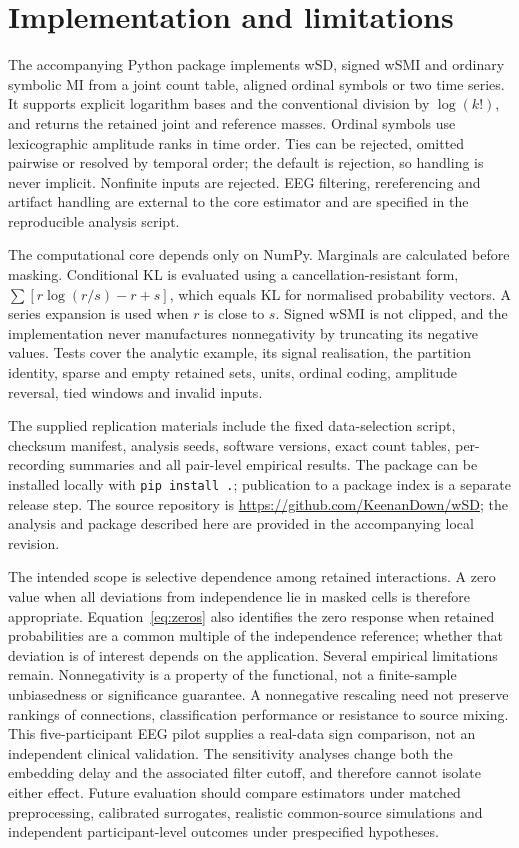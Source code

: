 \section{Implementation and limitations}
The accompanying Python package implements wSD, signed wSMI and ordinary symbolic MI from a joint count table, aligned ordinal symbols or two time series. It supports explicit logarithm bases and the conventional division by $\log(k!)$, and returns the retained joint and reference masses. Ordinal symbols use lexicographic amplitude ranks in time order. Ties can be rejected, omitted pairwise or resolved by temporal order; the default is rejection, so handling is never implicit. Nonfinite inputs are rejected. EEG filtering, rereferencing and artifact handling are external to the core estimator and are specified in the reproducible analysis script.

The computational core depends only on NumPy. Marginals are calculated before masking. Conditional KL is evaluated using a cancellation-resistant form, $\sum[r\log(r/s)-r+s]$, which equals KL for normalised probability vectors. A series expansion is used when $r$ is close to $s$. Signed wSMI is not clipped, and the implementation never manufactures nonnegativity by truncating its negative values. Tests cover the analytic example, its signal realisation, the partition identity, sparse and empty retained sets, units, ordinal coding, amplitude reversal, tied windows and invalid inputs.

The supplied replication materials include the fixed data-selection script, checksum manifest, analysis seeds, software versions, exact count tables, per-recording summaries and all pair-level empirical results. The package can be installed locally with \texttt{pip install .}; publication to a package index is a separate release step. The source repository is \url{https://github.com/KeenanDown/wSD}; the analysis and package described here are provided in the accompanying local revision.

The intended scope is selective dependence among retained interactions. A zero value when all deviations from independence lie in masked cells is therefore appropriate. Equation~\eqref{eq:zeros} also identifies the zero response when retained probabilities are a common multiple of the independence reference; whether that deviation is of interest depends on the application. Several empirical limitations remain. Nonnegativity is a property of the functional, not a finite-sample unbiasedness or significance guarantee. A nonnegative rescaling need not preserve rankings of connections, classification performance or resistance to source mixing. This five-participant EEG pilot supplies a real-data sign comparison, not an independent clinical validation. The sensitivity analyses change both the embedding delay and the associated filter cutoff, and therefore cannot isolate either effect. Future evaluation should compare estimators under matched preprocessing, calibrated surrogates, realistic common-source simulations and independent participant-level outcomes under prespecified hypotheses.
